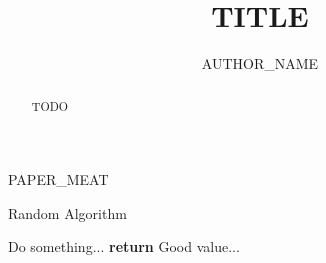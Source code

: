 \documentclass{llncs}
\begin{document}
\mainmatter              %
\title{TITLE}

\author{AUTHOR_NAME}


\maketitle

\begin{abstract}
TODO
\end{abstract}

PAPER_MEAT

\begin{algorithm}[t]
  \caption{Random Algorithm}
  \begin{algorithmic}[1]

    \State Do something...
    \State \textbf{return} Good value...
\EndFunction

\end{algorithmic}
\end{algorithm}

\medskip
\small


\end{document}
